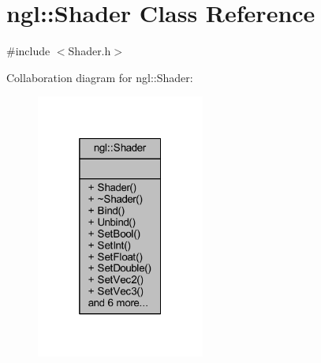 \hypertarget{classngl_1_1_shader}{}\section{ngl\+:\+:Shader Class Reference}
\label{classngl_1_1_shader}


{\ttfamily \#include $<$Shader.\+h$>$}



Collaboration diagram for ngl\+:\+:Shader\+:
\nopagebreak
\begin{figure}[H]
\begin{center}
\leavevmode
\includegraphics[width=157pt]{classngl_1_1_shader__coll__graph}
\end{center}
\end{figure}
